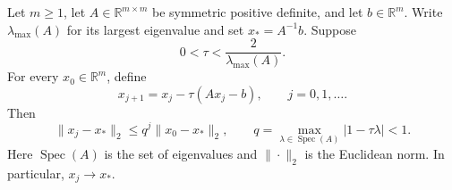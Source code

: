 Let $m\geq1$, let $A\in\mathbb R^{m\times m}$ be symmetric positive
definite, and let $b\in\mathbb R^m$. Write $\lambda_{\max}(A)$ for its
largest eigenvalue and set $x_*=A^{-1}b$. Suppose
\[
0<\tau<\frac{2}{\lambda_{\max}(A)}.
\]
For every $x_0\in\mathbb R^m$, define
\[
x_{j+1}=x_j-\tau(Ax_j-b),\qquad j=0,1,\ldots.
\]
Then
\[
\|x_j-x_*\|_2\leq q^j\|x_0-x_*\|_2,\qquad
q=\max_{\lambda\in\operatorname{Spec}(A)}|1-\tau\lambda|<1.
\]
Here $\operatorname{Spec}(A)$ is the set of eigenvalues and $\|\cdot\|_2$
is the Euclidean norm. In particular, $x_j\to x_*$.

